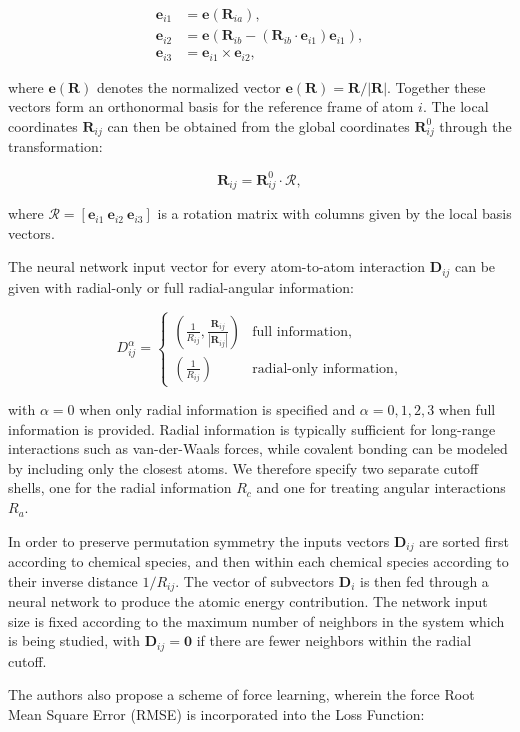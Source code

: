 \begin{equation}
\begin{split}
    \bm{e}_{i1} &= \bm{e}(\bm{R}_{ia}) , \\
    \bm{e}_{i2} &= \bm{e}(\bm{R}_{ib} - (\bm{R}_{ib} \cdot \bm{e}_{i1})
    \bm{e}_{i1}) , \\
    \bm{e}_{i3} &= \bm{e}_{i1} \times \bm{e}_{i2} ,
\end{split}
\end{equation}

where $\bm{e}(\bm{R})$ denotes the normalized vector $\bm{e}(\bm{R})
    = \bm{R} / \left| \bm{R} \right|$. Together these vectors
form an orthonormal basis for the reference frame of atom $i$.
The local coordinates $\bm{R}_{ij}$
can then be obtained from the global coordinates $\bm{R}_{ij}^0$
through the transformation:

\begin{equation}
    \bm{R}_{ij} = \bm{R}_{ij}^0 \cdot \mathcal{R} ,
\end{equation}

where $\mathcal{R} = [\bm{e}_{i1} \ \bm{e}_{i2} \ \bm{e}_{i3}]$
is a rotation matrix with columns given by the local basis vectors.
\par
The neural network input vector for every atom-to-atom interaction
$\bm{D}_{ij}$ can be given with radial-only or full radial-angular
information:

\begin{equation}
    D_{ij}^{\alpha} =
\begin{cases}
    \displaystyle\left( \frac{1}{R_{ij}}, \frac{\bm{R}_{ij}}{\left| \bm{R}_{ij} \right|}
    \right) & \text{full information}, \\[10pt]
    \displaystyle\left( \frac{1}{R_{ij}} \right) & \text{radial-only information},
\end{cases}
\end{equation}

with $\alpha = 0$ when only radial information is specified
and $\alpha = 0,1,2,3$ when full information is provided. Radial information
is typically sufficient for long-range interactions such as van-der-Waals
forces, while covalent bonding can be modeled by including
only the closest atoms. We therefore specify two separate
cutoff shells, one for the radial information $R_c$ and one
for treating angular interactions $R_a$.
\par
In order to preserve permutation symmetry the inputs vectors $\bm{D}_{ij}$
are sorted first according to chemical species, and then within
each chemical species according to their inverse distance $1 / R_{ij}$.
The vector of subvectors $\bm{D}_i$ is then fed through a neural
network to produce the atomic energy contribution.
The network input size is fixed according to the maximum number of neighbors
in the system which is being studied, with $\bm{D}_{ij} = \bm{0}$
if there are fewer neighbors within the radial cutoff.
\par
The authors also propose a scheme of force learning, wherein
the force Root Mean Square Error (RMSE) is incorporated into the Loss Function:

